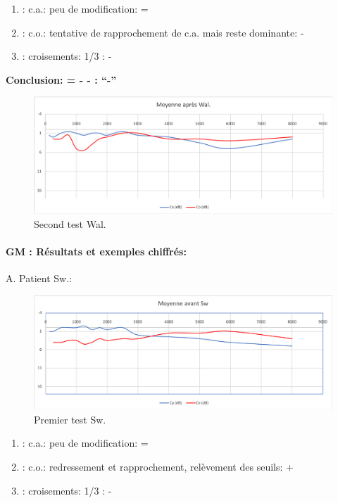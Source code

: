	\begin{enumerate}
 		
 		\item : c.a.: peu de modification: =
                
 		\item : c.o.: tentative de rapprochement de c.a. mais
                  reste dominante: -
 		\item : croisements: 1/3 :  -
                  
                \end{enumerate}

                \textbf{  Conclusion:  = -  -        : ``-''}

               \begin{figure}
\centering
\includegraphics[width=0.7\linewidth]{images/graphiques/wal_post.png}
\caption[Moyenne OG+OD]{Second test Wal.}
       
\label{groupecontroleimage1}
\end{figure}
                
 \paragraph{ GM : Résultats et exemples chiffrés:}
 A. Patient Sw.:

 \begin{figure}
\centering
\includegraphics[width=0.7\linewidth]{images/graphiques/sw_pre.png}
\caption[Moyenne OG+OD]{Premier test Sw.}
       
\label{groupecontroleimage1}
\end{figure}

	\begin{enumerate}
 		
 		\item : c.a.: peu de modification: =
                
 		\item : c.o.: redressement et rapprochement, relèvement des seuils: +
 		\item : croisements: 1/3 :  -
                  
                \end{enumerate}

